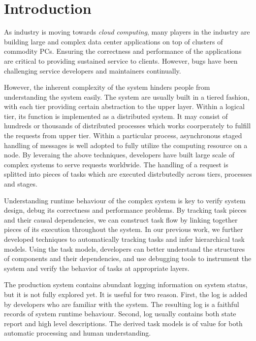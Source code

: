 
\section{Introduction}
\label{sec:intro}


As industry is moving towards \textit{cloud computing}, many
players in the industry are building large and complex data
center applications on top of clusters of commodity PCs.
Ensuring the correctness and performance of the applications
are critical to providing sustained service to clients.
However, bugs have been challenging service developers and
maintainers continually.

However, the inherent complexity of the system hinders
people from understanding the system easily. The system are
usually built in a tiered fashion, with each tier providing
certain abstraction to the upper layer. Within a logical
tier, its function is implemented as a distributed system.
It may consist of hundreds or thousands of distributed
processes which works coorperately to fulfill the requests
from upper tier. Within a particular process, asynchronous
staged handling of messages is well adopted to fully utilize
the computing resource on a node. By leveraing the above
techniques, developers have built large scale of complex
systems to serve requests worldwide. The handling of a
request is splitted into pieces of tasks which are executed
distrbutedly across tiers, processes and stages. 

Understanding runtime behaviour of the complex system is key
to verify system design, debug its correctness and
performance problems. By tracking task pieces and their
causal dependencies, we can construct task flow by linking
together pieces of its execution throughout the system.  In
our previous work, we further developed techniques to
automatically tracking tasks and infer hierarchical task
models. Using the task models, developers can better
understand the structures of components and their
dependencies, and use debugging tools to instrument the
system and verify the behavior of tasks at appropriate
layers.

The production system contains abundant logging information
on system status, but it is not fully explored yet. It is
useful for two reason. First, the log is added by developers
who are familiar with the system.  The resulting log is a
faithful records of system runtime behaviour. Second, log
usually contains both state report and high level
descriptions. The derived task models is of value for both
automatic processing and human understanding.

